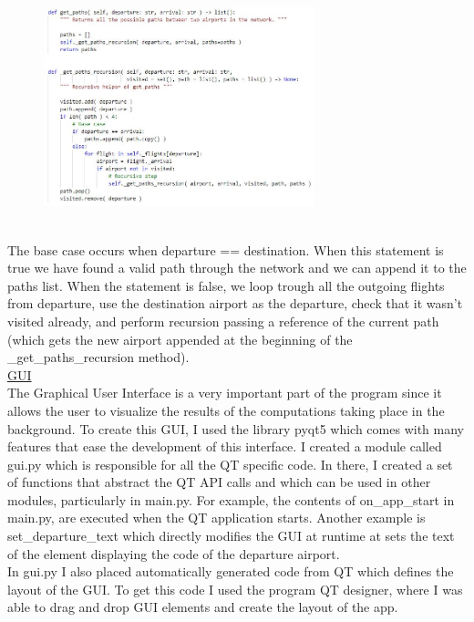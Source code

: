 \documentclass[fontsize=11pt]{article}
\begin{document}
\begin{figure}
    \includegraphics[width=0.7\textwidth]{code1.jpg}
\end{figure} \\

\noindent
The base case occurs when departure == destination. When this statement is true we have found a valid path through the network and we can append it to the paths list. When the statement is false, we loop trough all the outgoing flights from departure, use the destination airport as the departure, check that it wasn’t visited already, and perform recursion passing a reference of the current path (which gets the new airport appended at the beginning of the \_get\_paths\_recursion method).\\

\noindent
\underline{GUI}\\

\noindent
The Graphical User Interface is a very important part of the program since it allows the user to visualize the results of the computations taking place in the background. To create this GUI, I used the library pyqt5 which comes with many features that ease the development of this interface. I created a module called gui.py which is responsible for all the QT specific code. In there, I created a set of functions that abstract the QT API calls and which can be used in other modules, particularly in main.py. For example, the contents of on\_app\_start in main.py, are executed when the QT application starts. Another example is set\_departure\_text which directly modifies the GUI at runtime at sets the text of the element displaying the code of the departure airport.\\

\noindent
In gui.py I also placed automatically generated code from QT which defines the layout of the GUI. To get this code I used the program QT designer, where I was able to drag and drop GUI elements and create the layout of the app.\\
\end{document}
